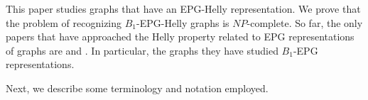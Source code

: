 \documentclass[9pt]{entcs}
\begin{document}







This paper studies graphs that have an EPG-Helly representation. We prove that the problem of recognizing $ B_1$-EPG-Helly graphs is $NP$-complete.  So far, the only papers that have approached the Helly property related to EPG representations of graphs are \cite{golumbic2009} and \cite{golumbic2013}. In particular, the graphs they have studied $B_1$-EPG representations. 


 
 
 Next, we describe some terminology and notation employed.

\end{document}
